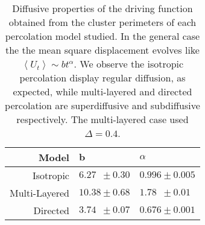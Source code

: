 \begin{table}[t]
\begin{centering}
\begin{tabular}{rll}
\bottomrule[0.1mm]
\toprule[0.1mm]
\textbf{Model}  & $\mathbf{b}$        & \boldmath$\alpha$   \\
\toprule[0.1mm]
Isotropic       & $6.27\,\,\,\pm0.30$ & $0.996\pm0.005$     \\[0.2cm]
Multi-Layered   & $10.38\pm0.68$      & $1.78\,\,\,\pm0.01$ \\[0.2cm]
Directed        & $3.74\,\,\,\pm0.07$ & $0.676\pm0.001$     \\[0.2cm]
\bottomrule[0.1mm]
\toprule[0.1mm]
\end{tabular}
\par\end{centering}
\caption{Diffusive properties of the driving function obtained from the cluster
    perimeters of each percolation model studied. In the general case the the
    mean square displacement evolves like $\left\langle U_t\right\rangle\sim
    bt^\alpha$. We observe the isotropic percolation display regular diffusion,
    as expected, while multi-layered and directed percolation are
    superdiffusive and subdiffusive respectively. The multi-layered case used
    $\Delta=0.4$.}
\label{tab:diff}
\end{table}

